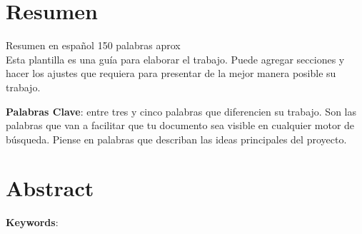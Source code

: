 
\chapter*{Resumen}
Resumen en español 150 palabras aprox\\
Esta plantilla es una guía para elaborar el trabajo. Puede agregar secciones y hacer los ajustes que requiera para presentar de la mejor manera posible su trabajo.

{\bf Palabras Clave}: entre tres y cinco palabras que diferencien su trabajo. Son las palabras que van a facilitar que tu documento sea visible en cualquier motor de búsqueda. Piense en palabras que describan las ideas principales del
proyecto.

\chapter*{Abstract}
{\bf Keywords}: 